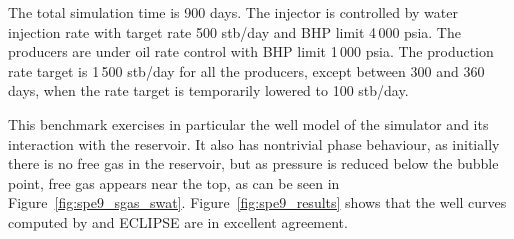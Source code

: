 The total simulation time is 900 days. The injector is controlled by water injection
rate with target rate 500 stb/day and BHP limit 4\,000 psia. The producers are
under oil rate control with BHP limit 1\,000 psia. The production rate target is
1\,500 stb/day for all the producers, except between 300 and
360 days, when the rate target is temporarily lowered to 100 stb/day.

This benchmark exercises in particular the well model of the simulator
and its interaction with the reservoir. It also has nontrivial phase
behaviour, as initially there is no free gas in the reservoir, but as
pressure is reduced below the bubble point, free gas appears near the
top, as can be seen in Figure~\ref{fig:spe9_sgas_swat}.
Figure~\ref{fig:spe9_results} shows that the well curves computed by
\opmflow and ECLIPSE are in excellent agreement.

